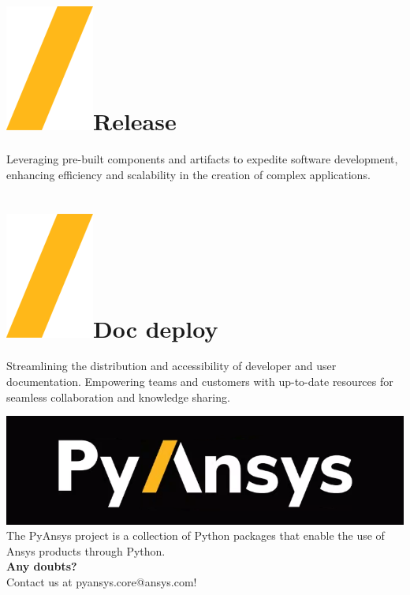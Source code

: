 \documentclass[a0paper,fleqn]{src/betterposter}
\begin{document}
{\section{\includegraphics[height=\fontcharht\font`\S]{img/general/slash.png}Release}
Leveraging pre-built components and artifacts to expedite software development,
enhancing efficiency and scalability in the creation of complex applications.

\section{\includegraphics[height=\fontcharht\font`\S]{img/general/slash.png}Doc deploy}
Streamlining the distribution and accessibility of developer and user
documentation. Empowering teams and customers with up-to-date resources for
seamless collaboration and knowledge sharing.

\vfil

\includegraphics[width=\textwidth]{img/general/pyansys_dark}\\
The PyAnsys project is a collection of Python packages that enable the use of Ansys products through Python.
\\
\newline
\textbf{Any doubts?} \\Contact us at pyansys.core@ansys.com!
\\
\newline

}
\end{document}

